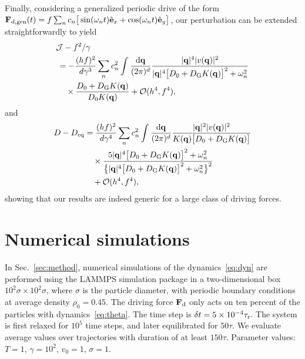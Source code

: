 \documentclass[superscriptaddress, twocolumn, prx, longbibliography, nofootinbib]{revtex4-1}
\begin{document}
Finally, considering a generalized periodic drive of the form ${\bf F}_{\rm d, gen}(t) = f \sum_n c_n\big[\sin(\omega_n t) \hat{\bf e}_x + \cos(\omega_n t)\hat{\bf e}_y \big]$, our perturbation can be extended straightforwardly to yield
\begin{equation}
	\begin{aligned}
		&{\cal J} - f^2/\gamma
		\\
		&\,= - \frac{(hf)^2}{d\gamma^3} \sum_n c_n^2 \int \frac{{\rm d}{\bf q}}{(2\pi)^d} \frac{|{\bf q}|^4 |v({\bf q})|^2}{|{\bf q}|^4\big[D_0+D_{\rm G}K({\bf q})\big]^2 + \omega_n^2}
		\\
		&\,\quad\times \frac{D_0+D_{\rm G}K({\bf q})}{D_0K({\bf q})} + {\cal O}(h^4,f^4) ,
		\\
	\end{aligned}
\end{equation}
and
\begin{equation}
	\begin{aligned}
		D - D_{\rm eq} &= \frac{(hf)^2}{d\gamma^4} \sum_n c_n^2 \int \frac{{\rm d}{\bf q}}{(2\pi)^d} \frac{|{\bf q}|^2|v({\bf q})|^2}{K({\bf q})\big[D_0+D_{\rm G}K({\bf q})\big]}
		\\
		&\quad\times \frac{5|{\bf q}|^4\big[D_0+D_{\rm G}K({\bf q})\big]^2 + \omega_n^2}{ \big\{ |{\bf q}|^4\big[D_0+D_{\rm G}K({\bf q})\big]^2 + \omega_n^2 \big\}^2}
		\\
		&\quad + {\cal O}(h^4,f^4) ,
	\end{aligned}
\end{equation}
showing that our results are indeed generic for a large class of driving forces.




\section{Numerical simulations}\label{app:simu}

In Sec.~\ref{sec:method}, numerical simulations of the dynamics~\eqref{eq:dyn} are performed using the LAMMPS simulation package in a two-dimensional box $10^2\sigma\times 10^2\sigma$, where $\sigma$ is the particle diameter, with periodic boundary conditions at average density $\rho_0=0.45$. The driving force ${\bf F}_{\rm d}$ only acts on ten percent of the particles with dynamics~\eqref{eq:theta}. The time step is $\delta t = 5\times 10^{-4} \tau_{\rm r}$. The system is first relaxed for $10^5$ time steps, and later equilibrated for $50\tau$. We evaluate average values over trajectories with duration of at least $150\tau$. Parameter values: $T=1$, $\gamma=10^2$, $v_0=1$, $\sigma=1$.
\end{document}
